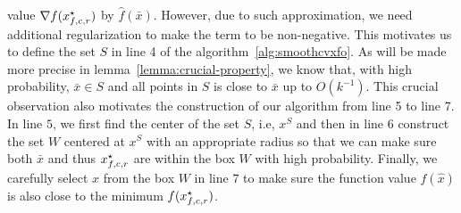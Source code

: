 \begin{remark}
value $\nabla f(x_{f, c, r}^\star)$ by $\hat{f}(\bar{x})$. However, due to such approximation,  
we need additional regularization to make the term to be non-negative. This motivates 
us to define the set $S$ in line 4 of the algorithm~\ref{alg:smoothcvxfo}. As will be made 
more precise in lemma~\ref{lemma:crucial-property}, we know that, with high probability, 
$\bar{x} \in S$ and all points in $S$ is close to $\bar{x}$ up to $O(k^{-1})$. This crucial 
observation also motivates the construction of our algorithm from line 5 to line 7. In line 
$5$, we first find the center of the set $S$, i.e, $x^S$ and then in line 6 construct the 
set $W$ centered at $x^S$ with an appropriate radius so that we can make sure 
both $\bar{x}$ and thus $x_{f, c, r}^\star$ are within the box $W$ with high probability. 
Finally, we carefully select $\hat{x}$ from the box $W$ in line $7$ to make sure the 
function value $f(\hat{x})$ is also close to the minimum $f(x_{f, c, r}^\star)$.


%
\end{remark}

